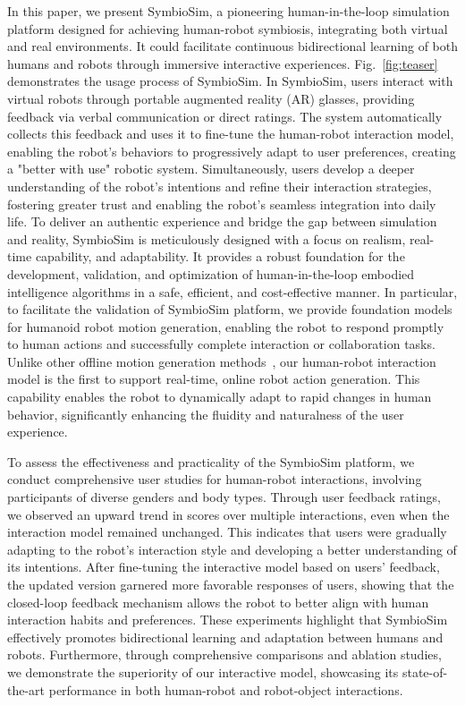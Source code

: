 In this paper, we present SymbioSim, a pioneering human-in-the-loop simulation platform designed for achieving human-robot symbiosis, integrating both virtual and real environments. It could facilitate continuous bidirectional learning of both humans and robots through immersive interactive experiences. Fig.~\ref{fig:teaser} demonstrates the usage process of SymbioSim. In SymbioSim, users interact with virtual robots through portable augmented reality (AR) glasses, providing feedback via verbal communication or direct ratings. The system automatically collects this feedback and uses it to fine-tune the human-robot interaction model, enabling the robot's behaviors to progressively adapt to user preferences, creating a "better with use" robotic system. Simultaneously, users develop a deeper understanding of the robot's intentions and refine their interaction strategies, fostering greater trust and enabling the robot’s seamless integration into daily life. To deliver an authentic experience and bridge the gap between simulation and reality, SymbioSim is meticulously designed with a focus on realism, real-time capability, and adaptability. It provides a robust foundation for the development, validation, and optimization of human-in-the-loop embodied intelligence algorithms in a safe, efficient, and cost-effective manner.
In particular, to facilitate the validation of SymbioSim platform, we provide foundation models for humanoid robot motion generation, enabling the robot to respond promptly to human actions and successfully complete interaction or collaboration tasks. Unlike other offline motion generation methods~\cite{xu2023interdiff,xu2024regennet}, our human-robot interaction model is the first to support real-time, online robot action generation. This capability enables the robot to dynamically adapt to rapid changes in human behavior, significantly enhancing the fluidity and naturalness of the user experience. 



To assess the effectiveness and practicality of the SymbioSim platform, we conduct comprehensive user studies for human-robot interactions, involving participants of diverse genders and body types. Through user feedback ratings, we observed an upward trend in scores over multiple interactions, even when the interaction model remained unchanged. This indicates that users were gradually adapting to the robot’s interaction style and developing a better understanding of its intentions. After fine-tuning the interactive model based on users' feedback, the updated version garnered more favorable responses of users, showing that the closed-loop feedback mechanism allows the robot to better align with human interaction habits and preferences. These experiments highlight that SymbioSim effectively promotes bidirectional learning and adaptation between humans and robots. Furthermore, through comprehensive comparisons and ablation studies, we demonstrate the superiority of our interactive model, showcasing its state-of-the-art performance in both human-robot and robot-object interactions.

